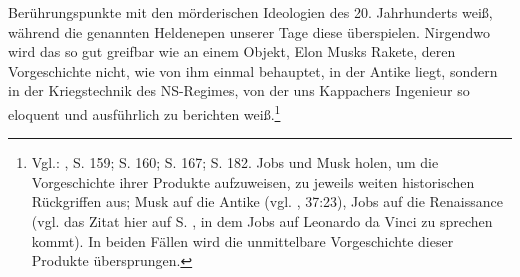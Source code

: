 \documentclass[%
	fontsize=10pt,%
	twoside,%
	headings=optiontoheadandtoc,%
	showtrims]{scrbook}
\begin{document}
Berührungspunkte mit den mörderischen Ideologien des 20. Jahrhunderts weiß, während die genannten Heldenepen unserer Tage diese überspielen. Nirgendwo wird das so gut greifbar wie an einem Objekt, Elon Musks Rakete, deren Vorgeschichte nicht, wie von ihm einmal behauptet, in der Antike liegt, sondern in der Kriegstechnik des NS-Regimes, von der uns Kappachers Ingenieur so eloquent und ausführlich zu berichten weiß.\footnote{Vgl.: \cite[][]{kappacher2000a}, S. 159; S. 160; S. 167; S. 182. Jobs und Musk holen, um die Vorgeschichte ihrer Produkte aufzuweisen, zu jeweils weiten historischen Rückgriffen aus; Musk auf die Antike (vgl. \cite[][]{musk2017a}, 37:23), Jobs auf die Renaissance (vgl. das Zitat hier auf S. \pageref{JOBS}, in dem Jobs auf Leonardo da Vinci zu sprechen kommt). In beiden Fällen wird die unmittelbare Vorgeschichte dieser Produkte übersprungen.} 
\end{document}
